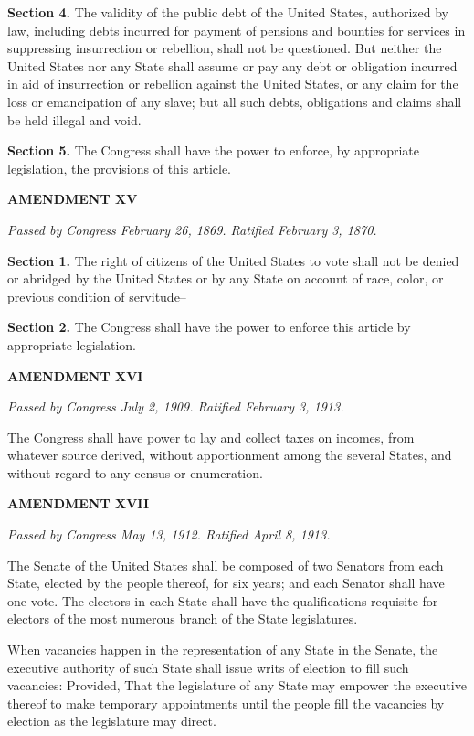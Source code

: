\textbf{Section 4.}
The validity of the public debt of the United States, authorized by law, including debts incurred for payment of pensions and bounties for services in suppressing insurrection or rebellion, shall not be questioned. But neither the United States nor any State shall assume or pay any debt or obligation incurred in aid of insurrection or rebellion against the United States, or any claim for the loss or emancipation of any slave; but all such debts, obligations and claims shall be held illegal and void.

\textbf{Section 5.}
The Congress shall have the power to enforce, by appropriate legislation, the provisions of this article.

\begin{center} 
\textbf{AMENDMENT XV}
\end{center} 

\textit{Passed by Congress February 26, 1869. Ratified February 3, 1870.}

\textbf{Section 1.}
The right of citizens of the United States to vote shall not be denied or abridged by the United States or by any State on account of race, color, or previous condition of servitude--

\textbf{Section 2.}
The Congress shall have the power to enforce this article by appropriate legislation.

\begin{center} 
\textbf{AMENDMENT XVI}
\end{center} 

\textit{Passed by Congress July 2, 1909. Ratified February 3, 1913.}

The Congress shall have power to lay and collect taxes on incomes, from whatever source derived, without apportionment among the several States, and without regard to any census or enumeration.

\begin{center} 
\textbf{AMENDMENT XVII}
\end{center} 

\textit{Passed by Congress May 13, 1912. Ratified April 8, 1913.}

The Senate of the United States shall be composed of two Senators from each State, elected by the people thereof, for six years; and each Senator shall have one vote. The electors in each State shall have the qualifications requisite for electors of the most numerous branch of the State legislatures.

When vacancies happen in the representation of any State in the Senate, the executive authority of such State shall issue writs of election to fill such vacancies: Provided, That the legislature of any State may empower the executive thereof to make temporary appointments until the people fill the vacancies by election as the legislature may direct.

